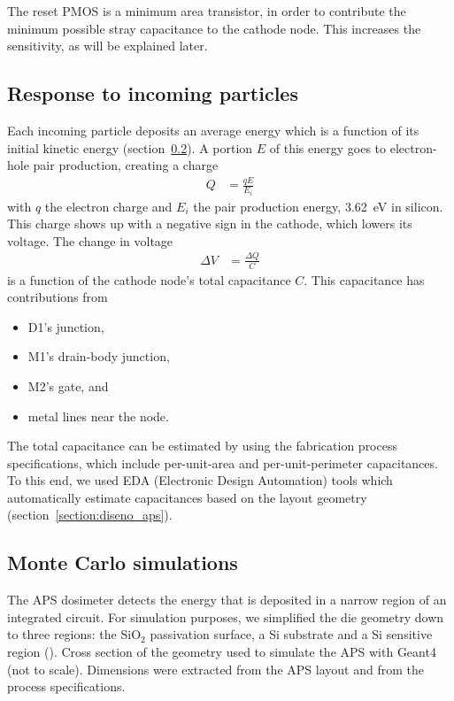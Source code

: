 The reset PMOS is a minimum area transistor,
in order to contribute the minimum possible stray capacitance
to the cathode node.
This increases the sensitivity, as will be explained later.
\subsection{Response to incoming particles}
Each incoming particle deposits an average energy which is a function of
its initial kinetic energy
\cite{berger_response_1969} (section~\ref{montecarloaps}).
A portion $E$ of this energy goes to electron-hole pair production,
creating a charge
\begin{align*}
    Q &= \frac{qE}{E_i}
\end{align*}
with $q$ the electron charge and $E_i$ the pair production energy,
\SI{3.62}{\electronvolt} in silicon.
This charge shows up with a negative sign in the cathode, which lowers its voltage.
The change in voltage
\begin{align*}
    \Delta V &= \frac{\Delta Q}{C}
\end{align*}
is a function of the cathode node's total capacitance $C$.
This capacitance has contributions from
\begin{itemize}
    \item D1's junction,
    \item M1's drain-body junction,
    \item M2's gate, and
    \item metal lines near the node.
\end{itemize}
The total capacitance can be estimated by using the 
fabrication process specifications,
which include per-unit-area and per-unit-perimeter capacitances.
To this end, we used EDA (Electronic Design Automation) tools
which automatically estimate capacitances
based on the layout geometry
(section~\ref{section:diseno_aps}).
\subsection{Monte Carlo simulations}
\label{montecarloaps}
The APS dosimeter detects the energy that is deposited
in a narrow region of an integrated circuit.
For simulation purposes,
we simplified the die geometry down to three regions:
the SiO$_2$ passivation surface, a Si substrate and
a Si sensitive region ().
{Cross section of the geometry used to simulate the APS with Geant4 (not to scale).}
Dimensions were extracted from the APS layout and
from the process specifications.

